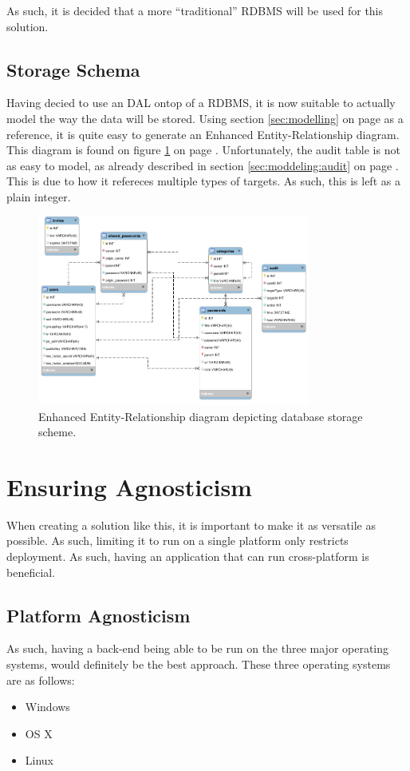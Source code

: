 		As such, it is decided that a more ``traditional'' RDBMS will be used for this solution.

		\subsection{Storage Schema}
			Having decied to use an DAL ontop of a RDBMS, it is now suitable to actually model the way the data will be stored. Using section \ref{sec:modelling} on page \pageref{sec:modelling} as a reference, it is quite easy to generate an Enhanced Entity-Relationship diagram. This diagram is found on figure \ref{fig:eer} on page \pageref{fig:eer}. Unfortunately, the audit table is not as easy to model, as already described in section \ref{sec:moddeling:audit} on page \pageref{sec:moddeling:audit}. This is due to how it refereces multiple types of targets. As such, this is left as a plain integer.

			\begin{figure}[p]
				\centering
				\includegraphics[width=0.8\textwidth]{figures/design/png/database2.png}
				\caption{Enhanced Entity-Relationship diagram depicting database storage scheme.}
				\label{fig:eer}
			\end{figure}

	\section{Ensuring Agnosticism}
		When creating a solution like this, it is important to make it as versatile as possible. As such, limiting it to run on a single platform only restricts deployment. As such, having an application that can run cross-platform is beneficial.

		\subsection{Platform Agnosticism}
			\label{sec:restrict:platform}
			As such, having a back-end being able to be run on the three major operating systems, would definitely be the best approach. These three operating systems are as follows:
			\begin{itemize}
				\item Windows
				\item OS X
				\item Linux
			\end{itemize}

